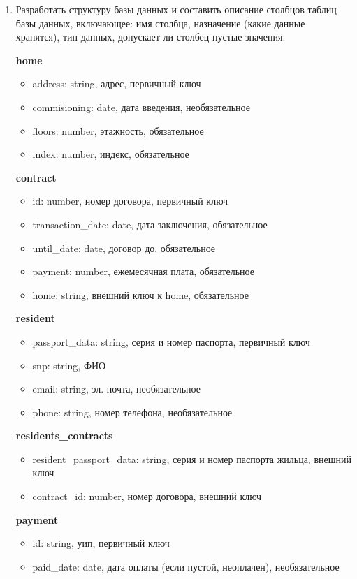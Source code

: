 \documentclass[a4paper,14pt]{extarticle}
\begin{document}
\begin{enumerate}[1.]
    \item Разработать структуру базы данных и составить описание 
    столбцов таблиц базы данных, включающее: имя столбца, 
    назначение (какие данные хранятся), тип данных, допускает ли столбец пустые значения.

    \textbf{home}
    \begin{itemize}
        \item address: string, адрес, первичный ключ
        \item commisioning: date, дата введения, необязательное
        \item floors: number, этажность, обязательное
        \item index: number, индекс, обязательное
    \end{itemize}
    \textbf{contract}
    \begin{itemize}
        \item id: number, номер договора, первичный ключ
        \item transaction\_date: date, дата заключения, обязательное
        \item until\_date: date, договор до, обязательное
        \item payment: number, ежемесячная плата, обязательное
        \item home: string, внешний ключ к home, обязательное
    \end{itemize}
    \textbf{resident}
    \begin{itemize}
        \item passport\_data: string, серия и номер паспорта, первичный ключ
        \item snp: string, ФИО
        \item email: string, эл. почта, необязательное
        \item phone: string, номер телефона, необязательное
    \end{itemize}
    \textbf{residents\_contracts}
    \begin{itemize}
        \item resident\_passport\_data: string, серия и номер паспорта жильца, внешний ключ
        \item contract\_id: number, номер договора, внешний ключ
    \end{itemize}
    \textbf{payment}
    \begin{itemize}
        \item id: string, уип, первичный ключ
        \item paid\_date: date, дата оплаты (если пустой, неоплачен), необязательное

\end{itemize}
\end{enumerate}
\end{document}
